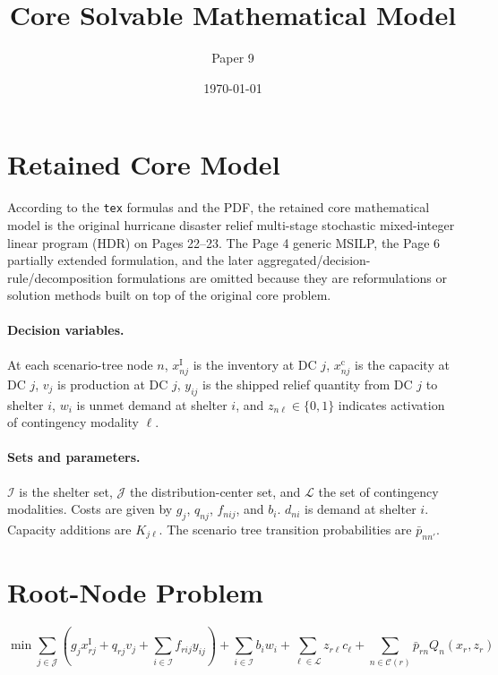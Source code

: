 \documentclass{article}
\title{Core Solvable Mathematical Model}
\author{Paper 9}
\date{\today}
\begin{document}
\maketitle

\section*{Retained Core Model}
According to the \texttt{tex} formulas and the PDF, the retained core mathematical model is the
original hurricane disaster relief multi-stage stochastic mixed-integer linear program (HDR) on
Pages 22--23. The Page 4 generic MSILP, the Page 6 partially extended formulation, and the later
aggregated/decision-rule/decomposition formulations are omitted because they are reformulations or
solution methods built on top of the original core problem.

\paragraph{Decision variables.}
At each scenario-tree node $n$, $x_{nj}^{\mathrm I}$ is the inventory at DC $j$,
$x_{nj}^{\mathrm c}$ is the capacity at DC $j$, $v_j$ is production at DC $j$,
$y_{ij}$ is the shipped relief quantity from DC $j$ to shelter $i$,
$w_i$ is unmet demand at shelter $i$, and $z_{n\ell}\in\{0,1\}$ indicates activation of
contingency modality $\ell$.

\paragraph{Sets and parameters.}
$\mathcal I$ is the shelter set, $\mathcal J$ the distribution-center set, and $\mathcal L$ the
set of contingency modalities. Costs are given by $g_j$, $q_{nj}$, $f_{nij}$, and $b_i$.
$d_{ni}$ is demand at shelter $i$. Capacity additions are $K_{j\ell}$.
The scenario tree transition probabilities are $\bar p_{nn'}$.

\section*{Root-Node Problem}
\begin{equation}
\min
\sum_{j \in \mathcal J}
\left(
g_j x_{rj}^{\mathrm I} + q_{rj} v_j + \sum_{i \in \mathcal I} f_{rij} y_{ij}
\right)
+
\sum_{i \in \mathcal I} b_i w_i
+
\sum_{\ell \in \mathcal L} z_{r\ell} c_\ell
+
\sum_{n \in \mathcal C(r)} \bar p_{rn} Q_n(x_r, z_r)
\tag{HDR}
\end{equation}
\end{document}
